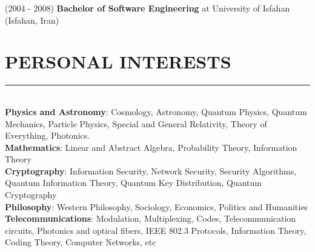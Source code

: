 \documentclass[10pt,a4paper]{article}
\begin{document}
\noindent \textbullet \hspace{0.1cm} (2004 - 2008)
\textbf{Bachelor of Software Engineering} at University of Isfahan (Isfahan, Iran)


\section{PERSONAL INTERESTS}
\noindent \rule {18.0cm}{0.2pt} \\
\textbullet \hspace{0.1cm} \textbf{Physics and Astronomy}: Cosmology, Astronomy, Quantum Physics, Quantum Mechanics, Particle Physics, Special and General Relativity, Theory of Everything, Photonics. \\
\textbullet \hspace{0.1cm} \textbf{Mathematics}: Linear and Abstract Algebra, Probability Theory, Information Theory \\
\textbullet \hspace{0.1cm} \textbf{Cryptography}: Information Security, Network Security, Security Algorithms, Quantum Information Theory, Quantum Key Distribution, Quantum Cryptography \\
\textbullet \hspace{0.1cm} \textbf{Philosophy}: Western Philosophy, Sociology, Economics, Politics and Humanities \\
\textbullet \hspace{0.1cm} \textbf{Telecommunications}: Modulation, Multiplexing, Codes, Telecommunication circuits, Photonics and optical fibers, IEEE 802.3 Protocols, Information Theory, Coding Theory, Computer Networks, etc \\
\end{document}
